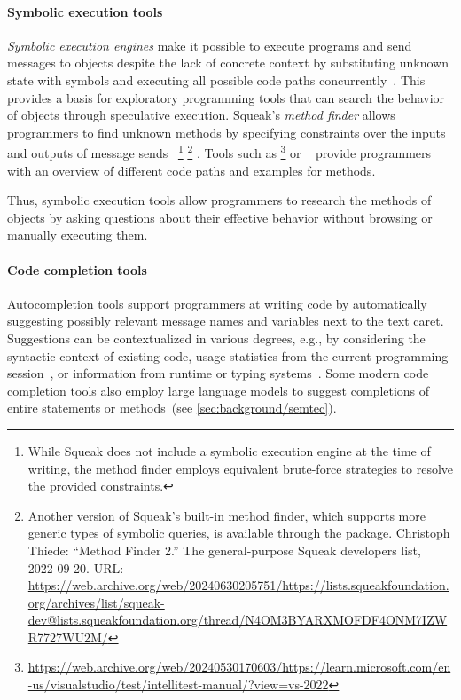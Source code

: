 	\paragraph{Symbolic execution tools}
	\label{par:background/expsys/tools/symbex}
	\emph{Symbolic execution engines} make it possible to execute programs and send messages to objects despite the lack of concrete context by substituting unknown state with symbols and executing all possible code paths concurrently~\cite{cadar2013symbolic,thiede2023symbolic}.
	This provides a basis for exploratory programming tools that can search the behavior of objects through speculative execution.
	Squeak's \emph{method finder} allows programmers to find unknown methods by specifying constraints over the inputs and outputs of message sends~\cite[sec.~1.8]{thiede2023squeak}%
	\footnote{While Squeak does not include a symbolic execution engine at the time of writing, the method finder employs equivalent brute-force strategies to resolve the provided constraints.}%
	\footnote{
		Another version of Squeak's built-in method finder, which supports more generic types of symbolic queries, is available through the  package.
		Christoph Thiede: ``Method Finder 2.'' The general-purpose Squeak developers list, 2022-09-20. URL:
		\url{https://web.archive.org/web/20240630205751/https://lists.squeakfoundation.org/archives/list/squeak-dev@lists.squeakfoundation.org/thread/N4OM3BYARXMOFDF4ONM7IZWR7727WU2M/}
	}%
	.
	Tools such as \footnote{
		\url{https://web.archive.org/web/20240530170603/https://learn.microsoft.com/en-us/visualstudio/test/intellitest-manual/?view=vs-2022}
	} or ~\cite{hentschel2019symbolic} provide programmers with an overview of different code paths and examples for methods.

	Thus, symbolic execution tools allow programmers to research the methods of objects by asking questions about their effective behavior without browsing or manually executing them.

	\paragraph{Code completion tools}
	\label{par:background/expsys/tools/completion}
	Autocompletion tools support programmers at writing code by automatically suggesting possibly relevant message names and variables next to the text caret.
	Suggestions can be contextualized in various degrees, e.g., by considering the syntactic context of existing code, usage statistics from the current programming session~\cite{robbes2008program}, or information from runtime or typing systems~\cite{pluquet2009fast}.
	Some modern code completion tools also employ large language models to suggest completions of entire statements or methods~(see \cref{sec:background/semtec}).

